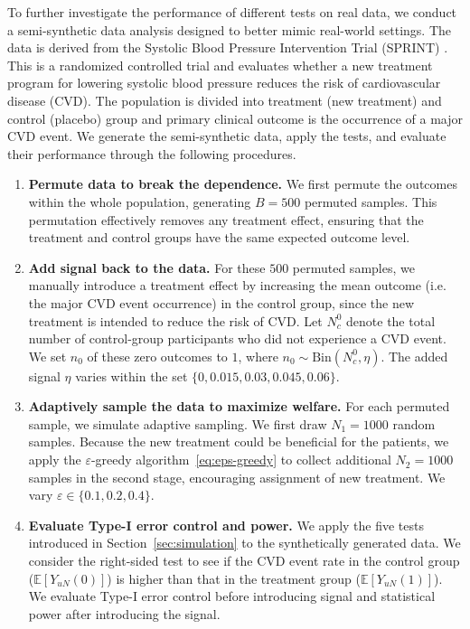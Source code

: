 \documentclass[12pt]{article}
\newcommand{\E}{\mathbb E}								%
\begin{document}
To further investigate the performance of different tests on real data,  
we conduct a semi-synthetic data analysis designed to better mimic real-world settings.  
The data is derived from the Systolic Blood Pressure Intervention Trial (SPRINT) \citep{ambrosius2014design}. This is a randomized controlled trial and evaluates whether a new treatment program for lowering systolic blood pressure reduces the risk of cardiovascular disease (CVD). The population is divided into treatment (new treatment) and control (placebo) group and primary clinical outcome is the occurrence of a major CVD event.  
We generate the semi-synthetic data, apply the tests, and evaluate their performance through the following procedures.

\begin{enumerate}
    \item \textbf{Permute data to break the dependence.}  
    We first permute the outcomes within the whole population, generating $B = 500$ permuted samples.  
    This permutation effectively removes any treatment effect, ensuring that the treatment and control groups have the same expected outcome level.
    
    \item \textbf{Add signal back to the data.}  
    For these $500$ permuted samples, we manually introduce a treatment effect by increasing the mean outcome (i.e. the major CVD event occurrence) in the control group, 
    since the new treatment is intended to reduce the risk of CVD. Let $N_c^0$ denote the total number of control-group participants who did not experience a CVD event. We set $n_0$ of these zero outcomes to $1$, where $n_0 \sim \mathrm{Bin}(N_c^0,\eta)$. The added signal $\eta$ varies within the set $\{0, 0.015, 0.03, 0.045, 0.06\}$.
    
    \item \textbf{Adaptively sample the data to maximize welfare.}  
    For each permuted sample, we simulate adaptive sampling. We first draw $N_1 = 1000$ random samples. Because the new treatment could be beneficial for the patients, we apply the $\varepsilon$-greedy algorithm~\eqref{eq:eps-greedy} to collect additional $N_2 = 1000$ samples in the second stage, encouraging assignment of new treatment. We vary $\varepsilon \in \{0.1, 0.2, 0.4\}$.
    
    \item \textbf{Evaluate Type-I error control and power.}  
    We apply the five tests introduced in Section~\ref{sec:simulation} to the synthetically generated data. We consider the right-sided test to see if the CVD event rate in the control group ($\E[Y_{uN}(0)]$) is higher than that in the treatment group ($\E[Y_{uN}(1)]$). We evaluate Type-I error control before introducing signal and statistical power after introducing the signal.
\end{enumerate}
\end{document}
